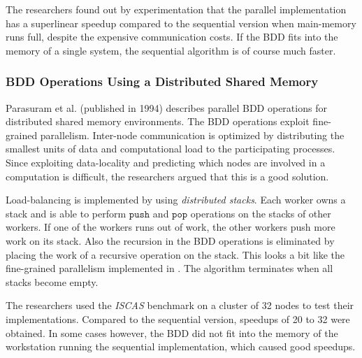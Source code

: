 The researchers found out by experimentation that the parallel implementation has a superlinear speedup compared to the sequential version when main-memory runs full, despite the expensive communication costs. If the BDD fits into the memory of a single system, the sequential algorithm is of course much faster.

\subsubsection{BDD Operations Using a Distributed Shared Memory}
Parasuram et al. \cite{parasuram1994parallel} (published in 1994) describes parallel BDD operations for distributed shared memory environments. The BDD operations exploit fine-grained parallelism. Inter-node communication is optimized by distributing the smallest units of data and computational load to the participating processes. Since exploiting data-locality and predicting which nodes are involved in a computation is difficult, the researchers argued that this is a good solution. 

Load-balancing is implemented by using \emph{distributed stacks}. Each worker owns a stack and is able to perform $\texttt{push}$ and $\texttt{pop}$ operations on the stacks of other workers. If one of the workers runs out of work, the other workers push more work on its stack. Also the recursion in the BDD operations is eliminated by placing the work of a recursive operation on the stack. This looks a bit like the fine-grained parallelism implemented in \cite{dijk2012parallelization}. The algorithm terminates when all stacks become empty.

The researchers used the \emph{ISCAS} benchmark \cite{brglez1985neutral} on a cluster of 32 nodes to test their implementations. Compared to the sequential version, speedups of 20 to 32 were obtained. In some cases however, the BDD did not fit into the memory of the workstation running the sequential implementation, which caused good speedups.
